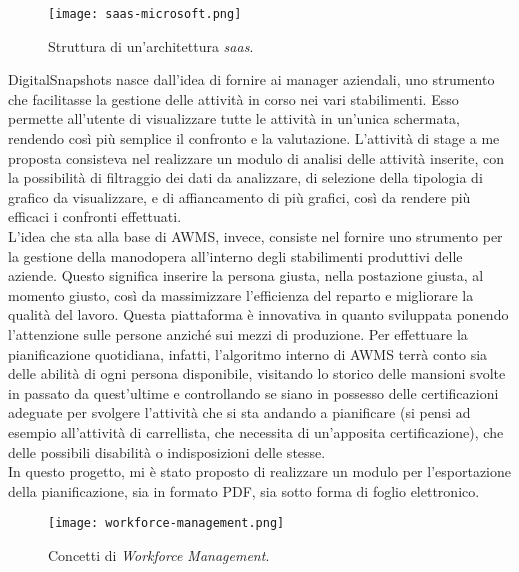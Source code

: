 \begin{figure}[h]
\texttt{[image: saas-microsoft.png]}
\centering
\caption{Struttura di un'architettura \textit{\acrshort{saas}}.} 
\label{fig:saas-microsoft}
\end{figure}

DigitalSnapshots nasce dall'idea di fornire ai manager aziendali, uno strumento che facilitasse la gestione delle attività in corso nei vari stabilimenti. Esso permette all'utente di visualizzare tutte le attività in un'unica schermata, rendendo così più semplice il confronto e la valutazione. 
L'attività di stage a me proposta consisteva nel realizzare un modulo di analisi delle attività inserite, con la possibilità di filtraggio dei dati da analizzare, di selezione della tipologia di grafico da visualizzare, e di affiancamento di più grafici, così da rendere più efficaci i confronti effettuati. \\
L'idea che sta alla base di AWMS, invece, consiste nel fornire uno strumento per la gestione della manodopera all'interno degli stabilimenti produttivi delle aziende.
Questo significa inserire la persona giusta, nella postazione giusta, al momento giusto, così da massimizzare l'efficienza del reparto e migliorare la qualità del lavoro.
Questa piattaforma è innovativa in quanto sviluppata ponendo l'attenzione sulle persone anziché sui mezzi di produzione. Per effettuare la pianificazione quotidiana, infatti, l'algoritmo interno di AWMS terrà conto sia delle abilità di ogni persona disponibile, visitando lo storico delle mansioni svolte in passato da quest'ultime e controllando se siano in possesso delle certificazioni adeguate per svolgere l'attività che si sta andando a pianificare (si pensi ad esempio all'attività di carrellista, che necessita di un'apposita certificazione), che delle possibili disabilità o indisposizioni delle stesse.\\
In questo progetto, mi è stato proposto di realizzare un modulo per l'esportazione della pianificazione, sia in formato PDF, sia sotto forma di foglio elettronico.
\begin{figure}[h]
\texttt{[image: workforce-management.png]}
\centering
\caption{Concetti di \textit{Workforce Management}.} 
\label{fig:workforce-management}
\end{figure}


